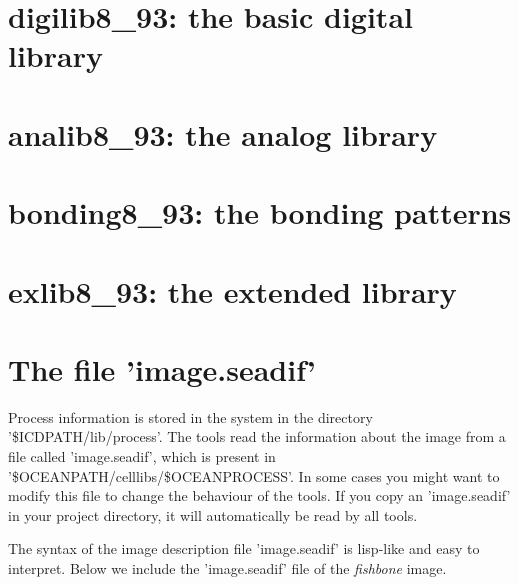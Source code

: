 \section{digilib8\_93: the basic digital library}












\section{analib8\_93: the analog library}


\section{bonding8\_93: the bonding patterns}


\section{exlib8\_93: the extended library}




\newpage
\pagestyle{plain}
\section{The file 'image.seadif'}
Process information is stored in the  system in the
directory '\$ICDPATH/lib/process'.  The  tools read the
information about the image from a file called 'image.seadif',
which is present in '\$OCEANPATH/celllibs/\$OCEANPROCESS'. In some
cases you might want to modify this file to change the behaviour
of the tools. If you copy an 'image.seadif' in your project
directory, it will automatically be read by all tools.

The syntax of the image description file 'image.seadif' is
lisp-like and easy to interpret. Below we include the
'image.seadif' file of the {\sl fishbone} image.

